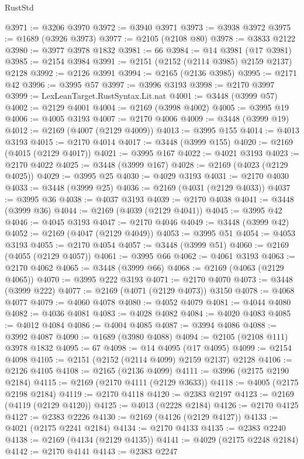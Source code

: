 \begin{lexlean}{RustStd}
\begin{coremodule}
@3971 := @3206 @3970
@3972 := @3940 @3971
@3973 := @3938 @3972
@3975 := @1689 (@3926 @3973)
@3977 := @2105 (@2108 @80)
@3978 := @3833 @2122
@3980 := @3977 @3978 @1832
@3981 := 66
@3984 := @14 @3981 (@17 @3981)
@3985 := @2154 @3984
@3991 := @2151 (@2152 (@2114 @3985) @2159 @2137) @2128
@3992 := @2126 @3991
@3994 := @2165 (@2136 @3985)
@3995 := @2171 @42
@3996 := @3995 @57
@3997 := @3996 @3193
@3998 := @2170 @3997
@3999 := LexLeanTarget.RustSyntax.Lit.nat
@4001 := @3448 (@3999 @57)
@4002 := @2129 @4001
@4004 := @2169 (@3998 @4002)
@4005 := @3995 @19
@4006 := @4005 @3193
@4007 := @2170 @4006
@4009 := @3448 (@3999 @19)
@4012 := @2169 (@4007 (@2129 @4009))
@4013 := @3995 @155
@4014 := @4013 @3193
@4015 := @2170 @4014
@4017 := @3448 (@3999 @155)
@4020 := @2169 (@4015 (@2129 @4017))
@4021 := @3995 @167
@4022 := @4021 @3193
@4023 := @2170 @4022
@4025 := @3448 (@3999 @167)
@4028 := @2169 (@4023 (@2129 @4025))
@4029 := @3995 @25
@4030 := @4029 @3193
@4031 := @2170 @4030
@4033 := @3448 (@3999 @25)
@4036 := @2169 (@4031 (@2129 @4033))
@4037 := @3995 @36
@4038 := @4037 @3193
@4039 := @2170 @4038
@4041 := @3448 (@3999 @36)
@4044 := @2169 (@4039 (@2129 @4041))
@4045 := @3995 @42
@4046 := @4045 @3193
@4047 := @2170 @4046
@4049 := @3448 (@3999 @42)
@4052 := @2169 (@4047 (@2129 @4049))
@4053 := @3995 @51
@4054 := @4053 @3193
@4055 := @2170 @4054
@4057 := @3448 (@3999 @51)
@4060 := @2169 (@4055 (@2129 @4057))
@4061 := @3995 @66
@4062 := @4061 @3193
@4063 := @2170 @4062
@4065 := @3448 (@3999 @66)
@4068 := @2169 (@4063 (@2129 @4065))
@4070 := @3995 @222 @3193
@4071 := @2170 @4070
@4073 := @3448 (@3999 @222)
@4077 := @2169 (@4071 (@2129 @4073)) @3150
@4078 := @4068 @4077
@4079 := @4060 @4078
@4080 := @4052 @4079
@4081 := @4044 @4080
@4082 := @4036 @4081
@4083 := @4028 @4082
@4084 := @4020 @4083
@4085 := @4012 @4084
@4086 := @4004 @4085
@4087 := @3994 @4086
@4088 := @3992 @4087
@4090 := @1689 (@3980 @4088)
@4094 := @2105 (@2108 @111) @3978 @1832
@4095 := 67
@4098 := @14 @4095 (@17 @4095)
@4099 := @2154 @4098
@4105 := @2151 (@2152 (@2114 @4099) @2159 @2137) @2128
@4106 := @2126 @4105
@4108 := @2165 (@2136 @4099)
@4111 := @3996 (@2175 @2190 @2184)
@4115 := @2169 (@2170 @4111 (@2129 @3633))
@4118 := @4005 (@2175 @2198 @2184)
@4119 := @2170 @4118
@4120 := @2383 @2197
@4123 := @2169 (@4119 (@2129 @4120))
@4125 := @4013 (@2228 @2184)
@4126 := @2170 @4125
@4127 := @2383 @2226
@4130 := @2169 (@4126 (@2129 @4127))
@4133 := @4021 (@2175 @2241 @2184)
@4134 := @2170 @4133
@4135 := @2383 @2240
@4138 := @2169 (@4134 (@2129 @4135))
@4141 := @4029 (@2175 @2248 @2184)
@4142 := @2170 @4141
@4143 := @2383 @2247

\end{coremodule}
\end{lexlean}
